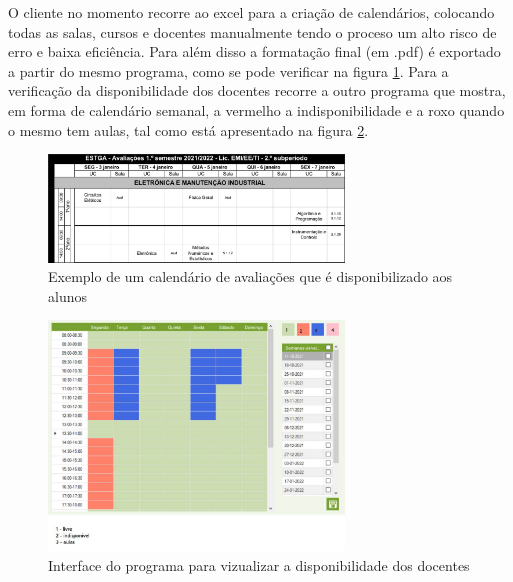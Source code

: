 \documentclass[11pt, twoside]{report}
\begin{document}
	O cliente no momento recorre ao excel para a criação de calendários,  colocando todas as salas, cursos e docentes manualmente tendo o proceso um alto risco de erro e baixa eficiência. Para além disso a formatação final (em .pdf) é exportado a partir do mesmo programa, como se pode verificar na figura \ref{calendarioatual}. Para a verificação da disponibilidade dos docentes recorre a outro programa que mostra, em forma de calendário semanal, a vermelho a indisponibilidade e a roxo quando o mesmo tem aulas, tal como está apresentado na figura \ref{disponibilidadedocentes}. 
	
	\begin{figure}[H] 
		\centering 
		\includegraphics[width=0.7\textwidth,height=0.7\textheight,keepaspectratio]{image/calendarioavaliacao}
		\caption{Exemplo de um calendário de avaliações que é disponibilizado aos alunos}
		\label{calendarioatual}
	\end{figure}

	\begin{figure}[H] 
		\centering 
		\includegraphics[width=0.7\textwidth,height=0.7\textheight,keepaspectratio]{image/ColorMap}
		\caption{Interface do programa para vizualizar a disponibilidade dos docentes}
		\label{disponibilidadedocentes}
	\end{figure}
	
\end{document}
